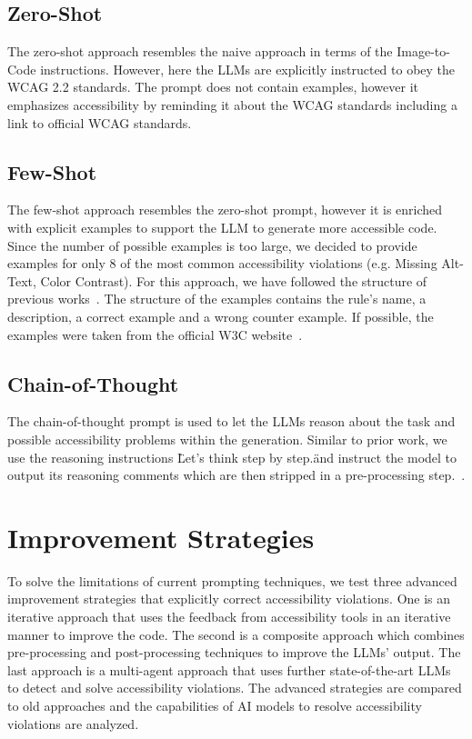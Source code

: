 \subsection{Zero-Shot}
The zero-shot approach resembles the naive approach in terms of the Image-to-Code
instructions. However, here the LLMs are explicitly instructed to obey the WCAG 
2.2 standards. The prompt does not contain examples, however it emphasizes 
accessibility by reminding it about the WCAG standards including a link to 
official WCAG standards.

\subsection{Few-Shot}
The few-shot approach resembles the zero-shot prompt, however it is enriched with 
explicit examples to support the LLM to generate more accessible code. 
Since the number of possible examples is too large, we decided to provide examples 
for only 8 of the most common accessibility violations (e.g. Missing Alt-Text, 
Color Contrast). 
For this approach, we have followed the structure of previous 
works~\parencite{suh2025accessiblecode}.
The structure of the examples contains the rule's name, a description, a
correct example and a wrong counter example. If possible, the examples 
were taken from the official W3C website~\parencite{wcag22}.

\subsection{Chain-of-Thought}
The chain-of-thought prompt is used to let the LLMs reason about the task and possible 
accessibility problems within the generation. Similar to prior work, we use 
the reasoning instructions \"Let’s think step by 
step.\" and instruct the model to output its reasoning comments which 
are then stripped in a pre-processing step.~\parencite{chae2024thinkexecute}.



\section{Improvement Strategies}
To solve the limitations of current prompting techniques, we test three 
advanced improvement strategies that explicitly correct accessibility 
violations. One is an iterative approach that uses the 
feedback from accessibility tools in an iterative manner to improve the code.
The second is a composite approach which combines 
pre-processing and post-processing techniques to improve the LLMs' output.
The last approach is a multi-agent approach that uses further 
state-of-the-art LLMs to detect and solve accessibility violations. \newline
The advanced strategies are compared to old approaches and the capabilities 
of AI models to resolve accessibility violations are analyzed.


